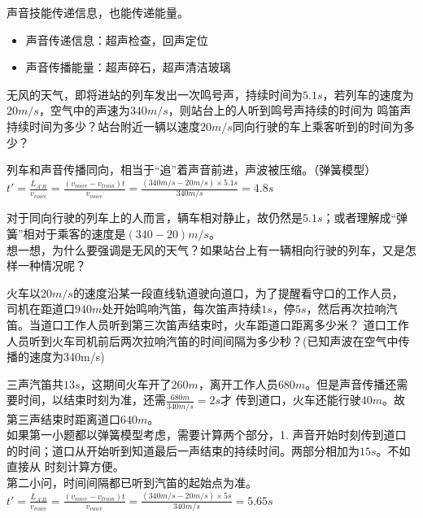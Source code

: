 \documentclass[windows,csize4]{BHCexam}
\begin{document}
\begin{groups}
    声音技能传递信息，也能传递能量。
    \begin{itemize}
        \item 声音传递信息：超声检查，回声定位
        \item 声音传播能量：超声碎石，超声清洁玻璃
    \end{itemize}


    \begin{questions}[]
        \question[5]无风的天气，即将进站的列车发出一次鸣号声，持续时间为$5.1s$，若列车的速度为$20m/s$，空气中的声速为$340m/s$，则站台上的人听到鸣号声持续的时间为
        鸣笛声持续时间为多少？站台附近一辆以速度$20m/s$同向行驶的车上乘客听到的时间为多少？
        \begin{solution}{0.5cm}
            \methodonly 列车和声音传播同向，相当于“追”着声音前进，声波被压缩。（弹簧模型）\\
            $t'=\frac{L_{A'B}}{v_{voice}}=\frac{(v_{voice}-v_{train})t}{v_{voice}}=\frac{(340m/s-20m/s)\times 5.1s}{340m/s}=4.8s$

            对于同向行驶的列车上的人而言，辆车相对静止，故仍然是$5.1s$；或者理解成“弹簧”相对于乘客的速度是$(340-20)m/s$。\\
            想一想，为什么要强调是无风的天气？如果站台上有一辆相向行驶的列车，又是怎样一种情况呢？
        \end{solution}
        \vspace{3.5cm}

        \question[5]火车以$20m/s$的速度沿某一段直线轨道驶向道口，为了提醒看守口的工作人员，
        司机在距道口$940m$处开始鸣响汽笛，每次笛声持续$1s$，停$5s$，然后再次拉响汽笛。当道口工作人员听到第三次笛声结束时，火车距道口距离多少米？
        道口工作人员听到火车司机前后两次拉响汽笛的时间间隔为多少秒？(已知声波在空气中传播的速度为340m/s)
        \begin{solution}{0.5cm}
            \methodonly 三声汽笛共$13s$，这期间火车开了$260m$，离开工作人员$680m$。但是声音传播还需要时间，以结束时刻为准，还需$\frac{680m}{340m/s}=2s$才
            传到道口，火车还能行驶$40m$。故第三声结束时距离道口$640m$。\\
            如果第一小题都以弹簧模型考虑，需要计算两个部分，1. 声音开始时刻传到道口的时间；道口从开始听到知道最后一声结束的持续时间。两部分相加为$15s$。不如直接从
            时刻计算方便。\\
            第二小问，时间间隔都已听到汽笛的起始点为准。
            $t'=\frac{L_{A'B}}{v_{voice}}=\frac{(v_{voice}-v_{train})t}{v_{voice}}=\frac{(340m/s-20m/s)\times 5s}{340m/s}=5.65s$
        \end{solution}
        \vspace{3.5cm}


\end{questions}
\end{groups}
\end{document}
